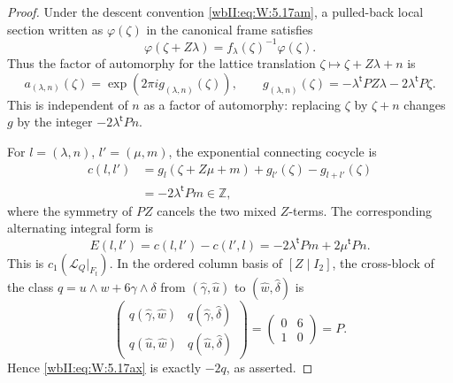 \begin{proof}
Under the descent convention \eqref{wbII:eq:W:5.17am}, a pulled-back local section
written as \(\varphi(\zeta)\) in the canonical frame satisfies
\[
 \varphi(\zeta+Z\lambda)
 =f_\lambda(\zeta)^{-1}\varphi(\zeta).
\]
Thus the factor of automorphy for the lattice translation
\(\zeta\mapsto\zeta+Z\lambda+n\) is
\[
 a_{(\lambda,n)}(\zeta)
 =\exp(2\pi i g_{(\lambda,n)}(\zeta)),
\qquad
 g_{(\lambda,n)}(\zeta)
 =-\lambda^{\mathsf t}PZ\lambda
  -2\lambda^{\mathsf t}P\zeta.
\tag{W.89}\label{wbII:eq:W:5.17av}
\]
This is independent of \(n\) as a factor of automorphy: replacing
\(\zeta\) by \(\zeta+n\) changes \(g\) by the integer
\(-2\lambda^{\mathsf t}Pn\).

For \(l=(\lambda,n)\), \(l'=(\mu,m)\), the exponential connecting
cocycle is
\begin{align*}
 c(l,l')
 &=g_l(\zeta+Z\mu+m)+g_{l'}(\zeta)-g_{l+l'}(\zeta)\\
 &=-2\lambda^{\mathsf t}Pm\in\mathbb Z,
\tag{W.90}\label{wbII:eq:W:5.17aw}
\end{align*}
where the symmetry of \(PZ\) cancels the two mixed \(Z\)-terms.
The corresponding alternating integral form is
\[
 E(l,l')=c(l,l')-c(l',l)
 =-2\lambda^{\mathsf t}Pm+2\mu^{\mathsf t}Pn.
\tag{W.91}\label{wbII:eq:W:5.17ax}
\]
This is \(c_1(\mathcal L_Q|_{F_t})\).  In the ordered column basis of
\([Z\mid I_2]\), the cross-block of the class
\(q=u\wedge w+6\gamma\wedge\delta\) from
\((\widehat\gamma,\widehat u)\) to
\((\widehat w,\widehat\delta)\) is
\[
 \begin{pmatrix}
 q(\widehat\gamma,\widehat w)&
 q(\widehat\gamma,\widehat\delta)\\
 q(\widehat u,\widehat w)&
 q(\widehat u,\widehat\delta)
 \end{pmatrix}
 =\begin{pmatrix}0&6\\1&0\end{pmatrix}=P.
\tag{W.92}\label{wbII:eq:W:5.17ay}
\]
Hence \eqref{wbII:eq:W:5.17ax} is exactly \(-2q\), as asserted.
\end{proof}

